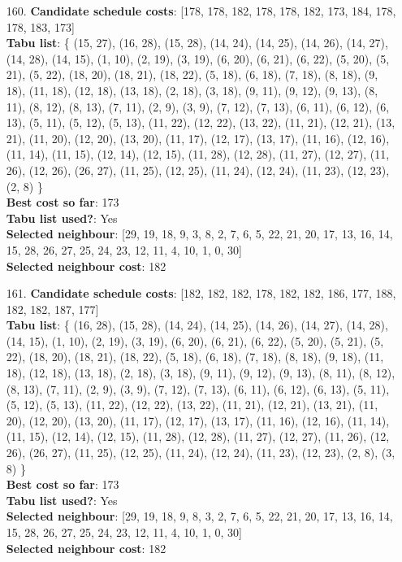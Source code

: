 \documentclass[fleqn]{article}
\begin{document}
\begin{itemize}
    \item[160.] \textbf{Candidate schedule costs}: [178, 178, 182, 178, 178, 182, 173, 184, 178, 178, 183, 173] \\
    \textbf{Tabu list}: \{ (15, 27), (16, 28), (15, 28), (14, 24), (14, 25), (14, 26), (14, 27), (14, 28), (14, 15), (1, 10), (2, 19), (3, 19), (6, 20), (6, 21), (6, 22), (5, 20), (5, 21), (5, 22), (18, 20), (18, 21), (18, 22), (5, 18), (6, 18), (7, 18), (8, 18), (9, 18), (11, 18), (12, 18), (13, 18), (2, 18), (3, 18), (9, 11), (9, 12), (9, 13), (8, 11), (8, 12), (8, 13), (7, 11), (2, 9), (3, 9), (7, 12), (7, 13), (6, 11), (6, 12), (6, 13), (5, 11), (5, 12), (5, 13), (11, 22), (12, 22), (13, 22), (11, 21), (12, 21), (13, 21), (11, 20), (12, 20), (13, 20), (11, 17), (12, 17), (13, 17), (11, 16), (12, 16), (11, 14), (11, 15), (12, 14), (12, 15), (11, 28), (12, 28), (11, 27), (12, 27), (11, 26), (12, 26), (26, 27), (11, 25), (12, 25), (11, 24), (12, 24), (11, 23), (12, 23), (2, 8) \} \\
    \textbf{Best cost so far}: 173 \\
    \textbf{Tabu list used?}: Yes \\
    \textbf{Selected neighbour}: [29, 19, 18, 9, 3, 8, 2, 7, 6, 5, 22, 21, 20, 17, 13, 16, 14, 15, 28, 26, 27, 25, 24, 23, 12, 11, 4, 10, 1, 0, 30] \\
    \textbf{Selected neighbour cost}: 182
      

    \item[161.] \textbf{Candidate schedule costs}: [182, 182, 182, 178, 182, 182, 186, 177, 188, 182, 182, 187, 177] \\
    \textbf{Tabu list}: \{ (16, 28), (15, 28), (14, 24), (14, 25), (14, 26), (14, 27), (14, 28), (14, 15), (1, 10), (2, 19), (3, 19), (6, 20), (6, 21), (6, 22), (5, 20), (5, 21), (5, 22), (18, 20), (18, 21), (18, 22), (5, 18), (6, 18), (7, 18), (8, 18), (9, 18), (11, 18), (12, 18), (13, 18), (2, 18), (3, 18), (9, 11), (9, 12), (9, 13), (8, 11), (8, 12), (8, 13), (7, 11), (2, 9), (3, 9), (7, 12), (7, 13), (6, 11), (6, 12), (6, 13), (5, 11), (5, 12), (5, 13), (11, 22), (12, 22), (13, 22), (11, 21), (12, 21), (13, 21), (11, 20), (12, 20), (13, 20), (11, 17), (12, 17), (13, 17), (11, 16), (12, 16), (11, 14), (11, 15), (12, 14), (12, 15), (11, 28), (12, 28), (11, 27), (12, 27), (11, 26), (12, 26), (26, 27), (11, 25), (12, 25), (11, 24), (12, 24), (11, 23), (12, 23), (2, 8), (3, 8) \} \\
    \textbf{Best cost so far}: 173 \\
    \textbf{Tabu list used?}: Yes \\
    \textbf{Selected neighbour}: [29, 19, 18, 9, 8, 3, 2, 7, 6, 5, 22, 21, 20, 17, 13, 16, 14, 15, 28, 26, 27, 25, 24, 23, 12, 11, 4, 10, 1, 0, 30] \\
    \textbf{Selected neighbour cost}: 182
      


\end{itemize}
\end{document}
